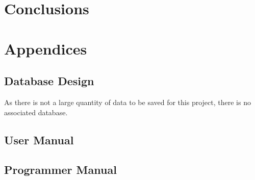 \documentclass{article}
\begin{document}
\section{Conclusions}

\newpage

\section{Appendices}
\subsection{Database Design}
As there is not a large quantity of data to be saved for this project, there is no associated 
database.

\subsection{User Manual}

\subsection{Programmer Manual}

\newpage





\end{document}
